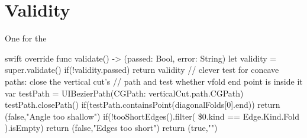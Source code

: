 \section{Validity}\label{validity}

One for the

\singlespacing 

\begin{pygmented}{swift}
override func validate() -> (passed: Bool, error: String) {
 let validity = super.validate()    
 if(!validity.passed){
    return validity
 }
 // clever test for concave paths: close the vertical cut's
 // path and test whether vfold end point is inside it
 var testPath = UIBezierPath(CGPath: verticalCut.path.CGPath)
 testPath.closePath()
 if(testPath.containsPoint(diagonalFolds[0].end)){
    return (false,"Angle too shallow")
 }
 if(!tooShortEdges().filter({
    \$0.kind == Edge.Kind.Fold
    }).isEmpty){
        return (false,"Edges too short")
 }
    return (true,"")
 }
\end{pygmented}

\doublespacing
